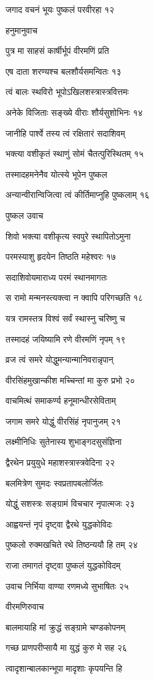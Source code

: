 जगाद वचनं भूयः पुष्कलं परवीरहा १२

हनुमानुवाच

पुत्र मा साहसं कार्षीर्भूपं वीरमणिं प्रति

एष दाता शरण्यश्च बलशौर्यसमन्वितः १३

त्वं बालः स्थविरो भूपोऽखिलशस्त्रास्त्रवित्तमः

अनेके विजिताः सङ्ख्ये वीराः शौर्यसुशोभिनः १४

जानीहि पार्श्वे तस्य त्वं रक्षितारं सदाशिवम्

भक्त्या वशीकृतं स्थाणुं सोमं चैतत्पुरिस्थितम् १५

तस्मादहमनेनैव योत्स्ये भूपेन पुष्कल

अन्यान्वीरान्विजित्वा त्वं कीर्तिमाप्नुहि पुष्कलाम् १६

पुष्कल उवाच

शिवो भक्त्या वशीकृत्य स्वपुरे स्थापितोऽमुना

परमस्याशु हृदयेन तिष्ठति महेश्वरः १७

सदाशिवोयमाराध्य परमं स्थानमागतः

स रामो मन्मनस्त्यक्त्वा न क्वापि परिगच्छति १८

यत्र रामस्तत्र विश्वं सर्वं स्थास्नु चरिष्णु च

तस्मादहं जयिष्यामि रणे वीरमणिं नृपम् १९

व्रज त्वं समरे योद्धुमन्यान्मानिवरान्नृपान्

वीरसिंहमुखान्कीश मच्चिन्तां मा कुरु प्रभो २०

वाचमित्थं समाकर्ण्य हनूमान्धीरसेविताम्

जगाम समरे योद्धुं वीरसिंहं नृपानुजम् २१

लक्ष्मीनिधिः सुतेनास्य शुभाङ्गदसुसंज्ञिना

द्वैरथेन प्रयुयुधे महाशस्त्रास्त्रवेदिना २२

बलमित्रेण सुमदः स्वप्रतापबलोर्जितः

योद्धुं सशस्त्रः सङ्ग्रामं विचचार नृपात्मजः २३

आह्वयन्तं नृपं दृष्ट्वा द्वैरथे युद्धकोविदः

पुष्कलो रुक्मखचिते रथे तिष्ठन्ययौ हि तम् २४

राजा तमागतं दृष्ट्वा पुष्कलं युद्धकोविदम्

उवाच निर्भिया वाण्या रणमध्ये सुभाषितः २५

वीरमणिरुवाच

बालमायाहि मां क्रुद्धं सङ्ग्रामे चण्डकोपनम्

गच्छ प्राणपरीप्सायै मा युद्धं कुरु मे सह २६

त्वादृशान्बालकान्भूपा मादृशाः कृपयन्ति हि

